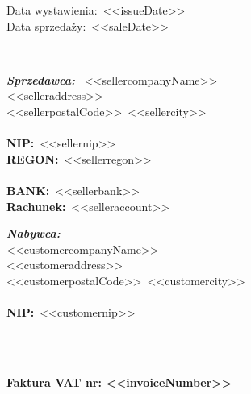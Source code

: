 \documentclass[12pt]{article}
\newcommand{\nipText}{\textbf{NIP:}}
\newcommand{\regonText}{\textbf{REGON:}}
\newcommand{\bankText}{\textbf{BANK:}}
\newcommand{\accountText}{\textbf{Rachunek:}}
\begin{document}
    \begin{footnotesize}
        \begin{flushright}
            \begin{minipage}[t]{.4\textwidth}
                Data wystawienia:~<<issueDate>> \\
                Data sprzedaży:~<<saleDate>>
            \end{minipage}
        \end{flushright}
    \end{footnotesize}

    \ \\

    \begin{small}
        \begin{minipage}[t]{.6\textwidth}
            \textbf{\emph{Sprzedawca:}} \
            <<sellercompanyName>> \\
            <<selleraddress>> \\
            <<sellerpostalCode>>~<<sellercity>> \\ \\
            \nipText~<<sellernip>> \\
            \regonText~<<sellerregon>> \\ \\
            \bankText~<<sellerbank>> \\
            \accountText~<<selleraccount>>
        \end{minipage}
        \begin{minipage}[t]{\textwidth}
            \textbf{\emph{Nabywca:}} \\
            <<customercompanyName>> \\
            <<customeraddress>> \\
            <<customerpostalCode>>~<<customercity>> \\ \\
            \nipText~<<customernip>>
        \end{minipage}
    \end{small}

    \ \\ \ \\

    \centerline{\textbf{\LARGE{Faktura VAT nr: <<invoiceNumber>>}}}

    \ \\
\end{document}
